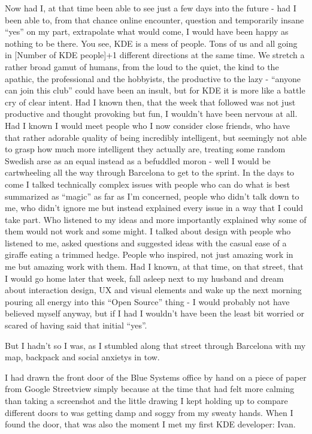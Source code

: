 Now had I, at that time been able to see just a few days into the future - had I been able to, from that chance online encounter, question and temporarily insane “yes” on my part, extrapolate what would come, I would have been happy as nothing to be there. 
You see, KDE is a mess of people. Tons of us and all going in [Number of KDE people]+1 different directions at the same time. We stretch a rather broad gamut of humans, from the loud to the quiet, the kind to the apathic, the professional and the hobbyists, the productive to the lazy - “anyone can join this club” could have been an insult, but for KDE it is more like a battle cry of clear intent.
Had I known then, that the week that followed was not just productive and thought provoking but fun, I wouldn’t have been nervous at all. Had I known I would meet people who I now consider close friends, who have that rather adorable quality of being incredibly intelligent, but seemingly not able to grasp how much more intelligent they actually are, treating some random Swedish arse as an equal instead as a befuddled moron - well I would be cartwheeling all the way through Barcelona to get to the sprint. 
In the days to come I talked technically complex issues with people who can do what is best summarized as “magic” as far as I’m concerned, people who didn’t talk down to me, who didn’t ignore me but instead explained every issue in a way that I could take part. Who listened to my ideas and more importantly explained why some of them would not work and some might.
I talked about design with people who listened to me, asked questions and suggested ideas with the casual ease of a giraffe eating a trimmed hedge. People who inspired, not just amazing work in me but amazing work with them. 
Had I known, at that time, on that street, that I would go home later that week, fall asleep next to my husband and dream about interaction design, UX and visual elements and wake up the next morning pouring all energy into this “Open Source” thing - I would probably not have believed myself anyway, but if I had I wouldn’t have been the least bit worried or scared of having said that initial “yes”. 

But I hadn’t so I was, as I stumbled along that street through Barcelona with my map, backpack and social anxietys in tow.

I had drawn the front door of the Blue Systems office by hand on a piece of paper from Google Streetview simply because at the time that had felt more calming than taking a screenshot and the little drawing I kept holding up to compare different doors to was getting damp and soggy from my sweaty hands. When I found the door, that was also the moment I met my first KDE developer: Ivan.


